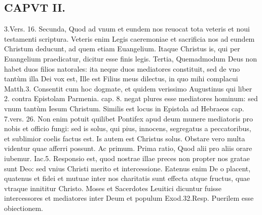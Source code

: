 \documentclass{article}
\begin{document}
\begin{pages}
\section*{CAPVT II. }
\marginpar{[ p.57 ]}\pstart 3.Vers. 16. Secunda, Quod ad vnum et eundem nos reuocat tota veteris et noui testamenti scriptura. Veteris enim Legis caeremoniae et sacrificia nos ad eundem Christum deducunt, ad quem etiam Euangelium. Itaque Christus is, qui per Euangelium praedicatur, dicitur esse finis legis. Tertia, Quemadmodum Deus non habet duos filios natorales: ita neque duos mediatores constituit, sed de vno tantùm illa Dei vox est, Ille est Filius meus dilectus, in quo mihi complacui Matth.3. Consentit cum hoc dogmate, et quidem verissimo Augustinus qui liber 2. contra Epistolam Parmenia. cap. 8. negat plures esse mediatores hominum: sed vnum tantùm Iesum Christum.  \pend\pstart Similis est locus in Epistola ad Hebraeos cap. 7.vers. 26. Non enim potuit quilibet Pontifex apud deum munere mediatoris pro nobis et officio fungi: sed is solus, qui pius, innocens, segregatus a peccatoribus, et sublimior coelis factus est. Is autem est Christus solus.  \pend\pstart Obstare vero multa videntur quae afferri possunt. Ac primum.  \pend\pstart Prima ratio, Quod alii pro aliis orare iubemur. Iac.5. Responsio est, quod nostrae illae preces non propter nos gratae sunt Deo: sed vnius Christi merito et intercessione. Eatenus enim De o placent, quatenus et fidei et mutuae inter nos charitatis sunt effecta atque fructus, quae vtraque  innititur Christo.  \pend{} Moses et Sacerdotes Leuitici dicuntur fuisse intercessores et mediatores inter Deum et populum Exod.32.Resp. Puerilem esse obiectionem.  \pend

\end{pages}
\end{document}
